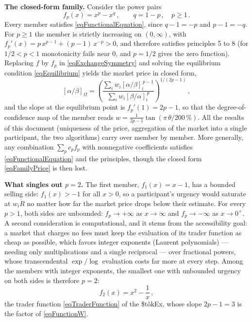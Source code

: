 \documentclass[letterpaper]{article}
\newcommand{\priceAB}{\left[\alpha / \beta\right]}
\newcommand{\priceBA}{\left[\beta / \alpha\right]}
\newcommand{\StokEx}{\$t\^{o}kEx}
\begin{document}
\textbf{The closed-form family.} Consider the power pairs
\begin{equation}
    f_p(x) = x^p - x^q\,, \qquad q = 1 - p\,, \quad p \geq 1\,. \label{eqTraderFamily}
\end{equation}
Every member satisfies \eqref{eqFunctionalEquation}, since $q - 1 = -p$ and $p - 1 = -q$. For $p \geq 1$ the member is strictly increasing on $(0, \infty)$, with $f_p'(x) = p\,x^{p-1} + (p-1)\,x^{-p} > 0$, and therefore satisfies principles 5 to 8 (for $1/2 < p < 1$ monotonicity fails near $0$, and $p = 1/2$ gives the zero function). Replacing $f$ by $f_p$ in \eqref{eqExchangeSymmetry} and solving the equilibrium condition \eqref{eqEquilibrium} yields the market price in closed form,
\begin{equation}
    \priceAB_\Omega = \left( \frac{\displaystyle \sum_i w_i \priceAB_i^{\,p-1}}{\displaystyle \sum_i w_i \priceBA_i^{\,p}} \right)^{1/(2p-1)}\,, \label{eqFamilyPrice}
\end{equation}
and the slope at the equilibrium point is $f_p'(1) = 2p - 1$, so that the degree-of-confidence map of the member reads $w = \frac{1}{2p-1} \tan\left(\pi\,\theta/200\,\%\right)$. All the results of this document (uniqueness of the price, aggregation of the market into a single participant, the two algorithms) carry over member by member. More generally, any combination $\sum_p c_p f_p$ with nonnegative coefficients satisfies \eqref{eqFunctionalEquation} and the principles, though the closed form \eqref{eqFamilyPrice} is then lost.

\textbf{What singles out $p = 2$.} The first member, $f_1(x) = x - 1$, has a bounded selling side: $f_1(x) > -1$ for all $x > 0$, so a participant's urgency would saturate at $w_i \dot{R}$ no matter how far the market price drops below their estimate. For every $p > 1$, both sides are unbounded: $f_p \to +\infty$ as $x \to \infty$ and $f_p \to -\infty$ as $x \to 0^+$. A second consideration is computational, and it stems from the accessibility goal: a market that charges no fees must keep the evaluation of its trader function as cheap as possible, which favors integer exponents (Laurent polynomials) --- needing only multiplications and a single reciprocal --- over fractional powers, whose transcendental $\exp/\log$ evaluation costs far more at every step. Among the members with integer exponents, the smallest one with unbounded urgency on both sides is therefore $p = 2$:
\begin{equation*}
    f_2(x) = x^2 - \frac{1}{x}\,,
\end{equation*}
the trader function \eqref{eqTraderFunction} of the \StokEx{}, whose slope $2p - 1 = 3$ is the factor of \eqref{eqFunctionW}.
\end{document}
